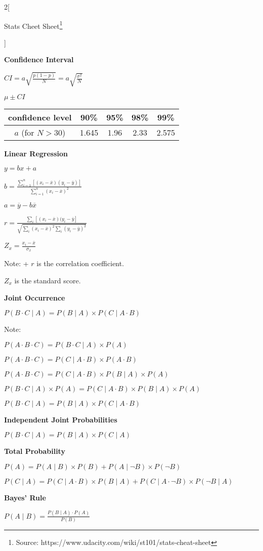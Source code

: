 \documentclass[9pt]{article}
\newcommand{\mytitle}{Stats Cheet Sheet}
\begin{document}
\begin{multicols}{2}[
	\begin{center}
		\mytitle \footnote{Source: https://www.udacity.com/wiki/st101/stats-cheat-sheet}
	\end{center}]
	
	\textbf{Confidence Interval}
	
	$CI=a\sqrt{\frac{p(1-p)}{N}} = a\sqrt{\frac{\sigma^2}{N}}$
	
	$\mu \pm CI$

	\begin{tabular}{ |c|c|c|c|c| }
		\hline
		confidence level & 90\% & 95\% & 98\% & 99\% \\
		\hline
		$a$ (for $N>30$) & 1.645 & 1.96 & 2.33 & 2.575 \\
		\hline
	\end{tabular}

\columnbreak
	
	\textbf{Linear Regression}
	
	$y=bx+a$
	
	$b=\frac{\sum_{i=1}^n[(x_i-\overline{x})(y_i-\overline{y})]}{\sum_{i=1}^n(x_i-\overline{x})^2}$
	
	$a=\overline{y}-b\overline{x}$
	
	$r=\frac{\sum_i[(x_i-\overline{x})(y_i-\overline{y}]}{\sqrt{\sum_i(x_i-\overline{x})^2\sum_i(y_i-\overline{y})^2}}$
	
	$Z_x=\frac{x_i-\overline{x}}{\sigma_x}$
	
	Note: + $r$ is the correlation coefficient.
	
	 $Z_x$ is the standard score.


	\textbf{Joint Occurrence}
	
	$P(B\cdot C\mid A)=P(B\mid A)\times P(C\mid A\cdot B)$
	
	Note:
	
	$P(A\cdot B\cdot C)=P(B\cdot C\mid A)\times P(A)$
	
	$P(A\cdot B\cdot C)=P(C\mid A\cdot B)\times P(A\cdot B)$
	
	$P(A\cdot B\cdot C)=P(C\mid A\cdot B)\times P(B\mid A)\times P(A)$
	
	$P(B\cdot C\mid A)\times P(A)=P(C\mid A\cdot B)\times P(B\mid A)\times P(A)$
	
	$P(B\cdot C\mid A)=P(B\mid A)\times P(C\mid A\cdot B)$
	
	
	\textbf{Independent Joint Probabilities}
	
	$P(B\cdot C\mid A)=P(B\mid A)\times P(C\mid A)$
	
	
	\textbf{Total Probability}
	
	$P(A)=P(A\mid B)\times P(B)+P(A\mid\neg B)\times P(\neg B)$
	
	$P(C\mid A)=P(C\mid A\cdot B)\times P(B\mid A)+P(C\mid A\cdot\neg B)\times P(\neg B\mid A)$
	
	
	\textbf{Bayes' Rule}
	
	$P(A\mid B)=\frac{P(B\mid A)\cdot P(A)}{P(B)}$
	
\end{multicols}
\end{document}
